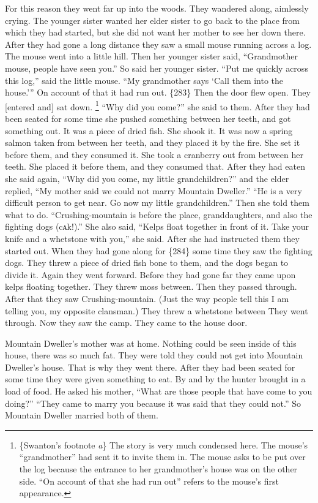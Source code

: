 For this reason they went far up into the woods.
They wandered along, aimlessly crying.
The younger sister wanted her elder sister to go back to the place from which they had started, but she did not want her mother to see her down there.
After they had gone a long distance they saw a small mouse running across a log.
The mouse went into a little hill.
Then her younger sister said,
“Grandmother mouse, people have seen you.”
So said her younger sister.
“Put me quickly across this log,”
said the little mouse.
“My grandmother says
‘Call them into the house.’”
On account of that it had run out.
\{283\}
Then the door flew open.
They [entered and] sat down.%
\footnote{\{Swanton’s footnote \textit{a}\}
The story is very much condensed here.
The mouse’s “grandmother” had sent it to invite them in.
The mouse asks to be put over the log because the entrance to her grandmother’s house was on the other side.
“On account of that she had run out” refers to the mouse’s first appearance.}
“Why did you come?”
she said to them.
After they had been seated for some time she pushed something between her teeth, and got something out.
It was a piece of dried fish.
She shook it.
It was now a spring salmon taken from between her teeth, and they placed it by the fire.
She set it before them, and they consumed it.
She took a cranberry out from between her teeth.
She placed it before them, and they consumed that.
After they had eaten she said again,
“Why did you come, my little grandchildren?”
and the elder replied,
“My mother said we could not marry Mountain Dweller.”
“He is a very difficult person to get near.
Go now my little grandchildren.”
Then she told them what to do.
“Crushing-mountain is before the place, granddaughters, and also the fighting dogs (cᴀk!).”
She also said,
“Kelps float together in front of it.
Take your knife and a whetstone with you,”
she said.
After she had instructed them they started out.
When they had gone along for
\{284\}
some time they saw the fighting dogs.
They threw a piece of dried fish bone to them, and the dogs began to divide it.
Again they went forward.
Before they had gone far they came upon kelps floating together.
They threw moss between.
Then they passed through.
After that they saw Crushing-mountain.
(Just the way people tell this I am telling you, my opposite clansman.)
They threw a whetstone between 
They went through.
Now they saw the camp.
They came to the house door.

Mountain Dweller’s mother was at home.
Nothing could be seen inside of this house, there was so much fat.
They were told they could not get into Mountain Dweller’s house.
That is why they went there.
After they had been seated for some time they were given something to eat.
By and by the hunter brought in a load of food.
He asked his mother,
“What are those people that have come to you doing?”
“They came to marry you because it was said that they could not.”
So Mountain Dweller married both of them.

